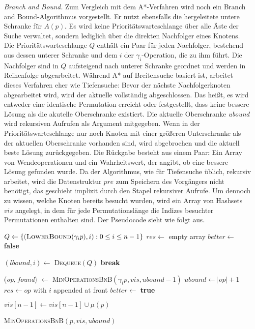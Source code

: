\documentclass[a4paper, 11pt, ngerman]{article}
\begin{document}
\noindent \emph{Branch and Bound.} Zum Vergleich mit dem A*-Verfahren wird noch ein Branch and Bound-Algorithmus vorgestellt. Er nutzt ebensfalls die hergeleitete untere Schranke für $A(p)$. Es wird keine Prioritätswarteschlange über alle Äste der Suche verwaltet, sondern lediglich über die direkten Nachfolger eines Knotens. Die Prioritätswarteschlange $Q$ enthält ein Paar für jeden Nachfolger, bestehend aus dessen unterer Schranke und dem $i$ der $\gamma_i$-Operation, die zu ihm führt. Die Nachfolger sind in $Q$ aufsteigend nach unterer Schranke geordnet und werden in Reihenfolge abgearbeitet. Während A* auf Breitensuche basiert ist, arbeitet dieses Verfahren eher wie Tiefensuche: Bevor der nächste Nachfolgerknoten abgearbeitet wird, wird der aktuelle vollständig abgeschlossen. Das heißt, es wird entweder eine identische Permutation erreicht oder festgestellt, dass keine bessere Lösung als die akutelle Oberschranke existiert. Die aktuelle Oberschranke \emph{ubound} wird rekursiven Aufrufen als Argument mitgegeben. Wenn in der Prioritätswarteschlange nur noch Knoten mit einer größeren Unterschranke als der aktuellen Oberschranke vorhanden sind, wird abgebrochen und die aktuell beste Lösung zurückgegeben. Die Rückgabe besteht aus einem Paar: Ein Array von Wendeoperationen und ein Wahrheitswert, der angibt, ob eine bessere Lösung gefunden wurde. Da der Algorithmus, wie für Tiefensuche üblich, rekursiv arbeitet, wird die Datenstruktur $pre$ zum Speichern des Vorgängers nicht benötigt, das geschieht implizit durch den Stapel rekursiver Aufrufe. Um dennoch zu wissen, welche Knoten bereits besucht wurden, wird ein Array von Hashsets $vis$ angelegt, in dem für jede Permutationslänge die Indizes besuchter Permutationen enthalten sind. Der Pseudocode sieht wie folgt aus.

\begin{algorithm}
    {
         \;
    }
    {
         \;
    }

    $Q \gets \{(\textsc{LowerBound}(\gamma_i p), i) : 0 \le i \le n - 1\}$ \;
    $res \gets$ empty array \;
    $better \gets$ \textbf{false} \;

    {
        $(lbound, i) \gets$ \textsc{Dequeue}$(Q)$ \;
        {
            \textbf{break} \;
        }

        (\emph{op}, \emph{found}) $\gets$ \textsc{MinOperationsBnB}$(\gamma_i p, vis, ubound - 1)$ \;
        {
            $ubound \gets |op| + 1$ \;
            $res \gets op$ with $i$ appended at front \;
            $better \gets$ \textbf{true} \;
        }
    }

    $vis[n - 1] \gets vis[n - 1] \cup \mu(p)$ \;
     \;

    \caption{\textsc{MinOperationsBnB}$(p, vis, ubound)$}
\end{algorithm}
\end{document}
